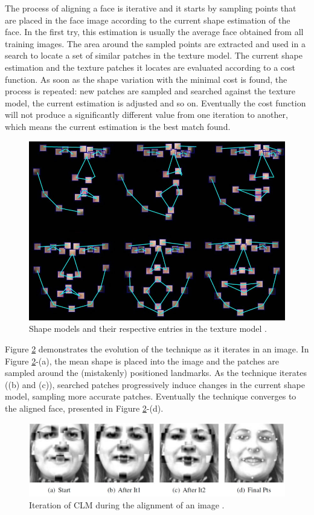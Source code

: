 The process of aligning a face is iterative and it starts by sampling points that are placed in the face image according to the current shape estimation of the face. In the first try, this estimation is usually the average face obtained from all training images. The area around the sampled points are extracted and used in a search to locate a set of similar patches in the texture model. The current shape estimation and the texture patches it locates are evaluated according to a cost function. As soon as the shape variation with the minimal cost is found, the process is repeated: new patches are sampled and searched against the texture model, the current estimation is adjusted and so on. Eventually the cost function will not produce a significantly different value from one iteration to another, which means the current estimation is the best match found.

\begin{figure}[h]
    \centering
    \includegraphics[width=0.6\linewidth]{figures/clm-patches.jpg}
    \caption{Shape models and their respective entries in the texture model \parencite{yu2010facial}.}
    \label{fig:clm-patches}
\end{figure}

Figure \ref{fig:clm-evolution} demonstrates the evolution of the technique as it iterates in an image. In Figure \ref{fig:clm-evolution}-(a), the mean shape is placed into the image and the patches are sampled around the (mistakenly) positioned landmarks. As the technique iterates ((b) and (c)), searched patches progressively induce changes in the current shape model, sampling more accurate patches. Eventually the technique converges to the aligned face, presented in Figure \ref{fig:clm-evolution}-(d).

\begin{figure}[h]
    \centering
    \includegraphics[width=\linewidth]{figures/clm-evolution.jpg}
    \caption{Iteration of CLM during the alignment of an image \parencite{cristinacce2006feature}.}
    \label{fig:clm-evolution}
\end{figure}


